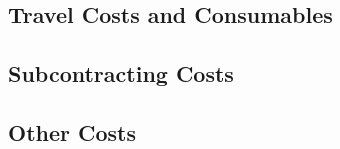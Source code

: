 \subsection{Travel Costs and Consumables}\label{sec:travel-costs}
\subsection{Subcontracting Costs}
\subsection{Other Costs}


